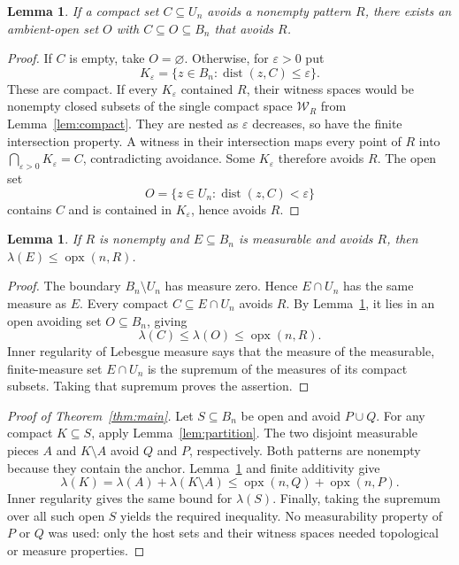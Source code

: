 \documentclass[11pt]{article}
\newtheorem{lemma}[theorem]{Lemma}
\DeclareMathOperator{\opx}{opx}
\newcommand{\area}{\lambda}
\begin{document}
\begin{lemma}\label{lem:collar}
If a compact set $C\subseteq U_n$ avoids a nonempty pattern $R$, there exists an ambient-open set $O$ with $C\subseteq O\subseteq B_n$ that avoids $R$.
\end{lemma}
\begin{proof}
If $C$ is empty, take $O=\varnothing$. Otherwise, for $\varepsilon>0$ put
\[
 K_\varepsilon=\{z\in B_n:\operatorname{dist}(z,C)\le\varepsilon\}.
\]
These are compact. If every $K_\varepsilon$ contained $R$, their witness spaces would be nonempty closed subsets of the single compact space $\mathcal W_R$ from Lemma~\ref{lem:compact}. They are nested as $\varepsilon$ decreases, so have the finite intersection property. A witness in their intersection maps every point of $R$ into $\bigcap_{\varepsilon>0}K_\varepsilon=C$, contradicting avoidance. Some $K_\varepsilon$ therefore avoids $R$. The open set
\[
 O=\{z\in U_n:\operatorname{dist}(z,C)<\varepsilon\}
\]
contains $C$ and is contained in $K_\varepsilon$, hence avoids $R$.
\end{proof}

\begin{lemma}\label{lem:transfer}
If $R$ is nonempty and $E\subseteq B_n$ is measurable and avoids $R$, then $\area(E)\le\opx(n,R)$.
\end{lemma}
\begin{proof}
The boundary $B_n\setminus U_n$ has measure zero. Hence $E\cap U_n$ has the same measure as $E$. Every compact $C\subseteq E\cap U_n$ avoids $R$. By Lemma~\ref{lem:collar}, it lies in an open avoiding set $O\subseteq B_n$, giving
\[
 \area(C)\le\area(O)\le\opx(n,R).
\]
Inner regularity of Lebesgue measure says that the measure of the measurable, finite-measure set $E\cap U_n$ is the supremum of the measures of its compact subsets. Taking that supremum proves the assertion.
\end{proof}

\begin{proof}[Proof of Theorem~\ref{thm:main}]
Let $S\subseteq B_n$ be open and avoid $P\cup Q$. For any compact $K\subseteq S$, apply Lemma~\ref{lem:partition}. The two disjoint measurable pieces $A$ and $K\setminus A$ avoid $Q$ and $P$, respectively. Both patterns are nonempty because they contain the anchor. Lemma~\ref{lem:transfer} and finite additivity give
\[
 \area(K)=\area(A)+\area(K\setminus A)
 \le\opx(n,Q)+\opx(n,P).
\]
Inner regularity gives the same bound for $\area(S)$. Finally, taking the supremum over all such open $S$ yields the required inequality. No measurability property of $P$ or $Q$ was used: only the host sets and their witness spaces needed topological or measure properties.
\end{proof}
\end{document}
